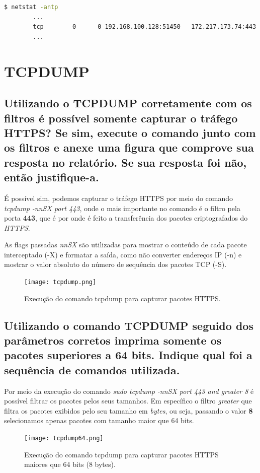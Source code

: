 \documentclass[12pt,a4paper]{report}
\begin{document}
\begin{lstlisting}[language=bash]
        $ netstat -antp   
        ...
        tcp        0      0 192.168.100.128:51450   172.217.173.74:443      ESTABLISHED 25502/chrome --type 
        ...
\end{lstlisting}


\section{TCPDUMP}
\subsection{Utilizando o TCPDUMP corretamente com os filtros é possível somente capturar o tráfego HTTPS? Se sim, execute o comando junto com os filtros e anexe uma figura que comprove sua resposta no relatório. Se sua resposta foi não, então justifique-a.}

É possível sim, podemos capturar o tráfego HTTPS por meio do comando \emph{tcpdump -nnSX port 443}, onde o mais importante no comando é o filtro pela porta \textbf{443}, que é por onde é feito a transferência dos pacotes criptografados do \emph{HTTPS}.

As flags passadas \emph{nnSX} são utilizadas para mostrar o conteúdo de cada pacote interceptado (-X) e formatar a saída, como não converter endereços IP (-n) e mostrar o valor absoluto do número de sequência dos pacotes TCP (-S).

\begin{figure}
  \texttt{[image: tcpdump.png]}
  \caption{Execução do comando tcpdump para capturar pacotes HTTPS.}
\end{figure}

\subsection{Utilizando o comando TCPDUMP seguido dos parâmetros corretos imprima somente os pacotes superiores a 64 bits. Indique qual foi a sequência de comandos utilizada.}

Por meio da execução do comando \emph{sudo tcpdump -nnSX port 443 and greater 8} é possível filtrar os pacotes pelos seus tamanhos. Em específico o filtro \emph{greater} que filtra os pacotes exibidos pelo seu tamanho em \emph{bytes}, ou seja, passando o valor \textbf{8} selecionamos apenas pacotes com tamanho maior que 64 bits.

\begin{figure}
        \texttt{[image: tcpdump64.png]}
        \caption{Execução do comando tcpdump para capturar pacotes HTTPS maiores que 64 bits (8 bytes).}
\end{figure}
\end{document}
